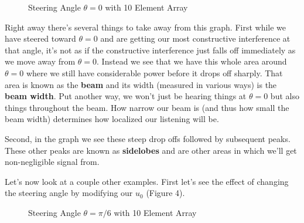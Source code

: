\documentclass[12pt,a6paper]{book}
\begin{document}
\begin{figure}[!htb]
\caption{\label{fig:my-label} Steering Angle $\theta=0$ with 10 Element Array}
\end{figure}

Right away there's several things to take away from this graph. First while we have steered toward $\theta=0$ and are getting our most constructive interference at that angle, it's not as if the constructive interference just falls off immediately as we move away from $\theta=0$. Instead we see that we have this whole area around $\theta=0$ where we still have considerable power before it drops off sharply. That area is known as the \textbf{beam} and its width (measured in various ways) is the \textbf{beam width}. Put another way, we won't just be hearing things at $\theta=0$ but also things throughout the beam. How narrow our beam is (and thus how small the beam width) determines how localized our listening will be. 

Second, in the graph we see these steep drop offs followed by subsequent peaks. These other peaks are known as \textbf{sidelobes} and are other areas in which we'll get non-negligible signal from. 

Let's now look at a couple other examples. First let's see the effect of changing the steering angle by modifying our $u_0$ (Figure 4). 

\begin{figure}[!htb]
\caption{\label{fig:my-label} Steering Angle $\theta=\pi/6$ with 10 Element Array}
\end{figure}
\end{document}

